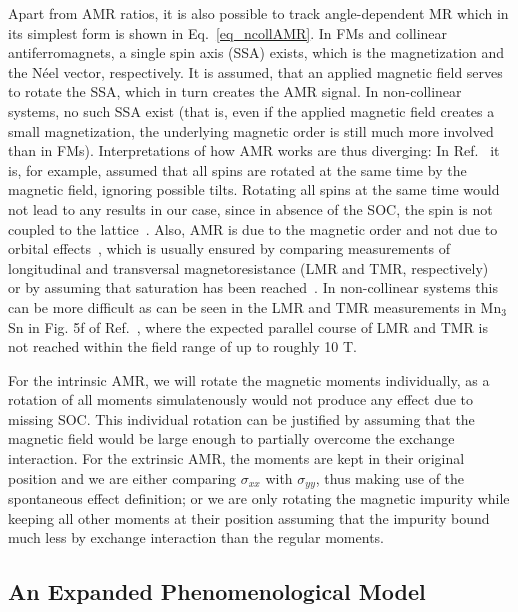 \documentclass[prb,showpacs,amsmath,amssymb,superscriptaddress,twocolumn,floatfix]{revtex4-1}
\begin{document}
Apart from AMR ratios, it is also possible to track angle-dependent MR which in its simplest form is shown in Eq.~\ref{eq_ncollAMR}. In FMs and collinear antiferromagnets, a single spin axis (SSA) exists, which is the magnetization and the N\'eel vector, respectively. It is assumed, that an applied magnetic field serves to rotate the SSA, which in turn creates the AMR signal. In non-collinear systems, no such SSA exist (that is, even if the applied magnetic field creates a small magnetization, the underlying magnetic order is still much more involved than in FMs). Interpretations of how AMR works are thus diverging: In Ref.~ it is, for example, assumed that all spins are rotated at the same time by the magnetic field, ignoring possible tilts. Rotating all spins at the same time would not lead to any results in our case, since in absence of the SOC, the spin is not coupled to the lattice~\cite{Gonzalez-Hernandez:2024}. Also, AMR is due to the magnetic order and not due to orbital effects~\cite{Ritzinger:2023}, which is usually ensured by comparing measurements of longitudinal and transversal magnetoresistance (LMR and TMR, respectively)~\cite{Bakonyi:2022} or by assuming that saturation has been reached~\cite{Ritzinger:2021}. In non-collinear systems this can be more difficult as can be seen in the LMR and TMR measurements in Mn$_3$Sn in Fig. 5f of Ref.~, where the expected parallel course of LMR and TMR is not reached within the field range of up to roughly 10 T.

For the intrinsic AMR, we will rotate the magnetic moments individually, as a rotation of all moments simulatenously would not produce any effect due to missing SOC. This individual rotation can be justified by assuming that the magnetic field would be large enough to partially overcome the exchange interaction. For the extrinsic AMR, the moments are kept in their original position and we are either comparing $\sigma_{xx}$ with $\sigma_{yy}$, thus making use of the spontaneous effect definition; or we are only rotating the magnetic impurity while keeping all other moments at their position assuming that the impurity bound much less by exchange interaction than the regular moments. 

\subsection{An Expanded Phenomenological Model}
\end{document}
